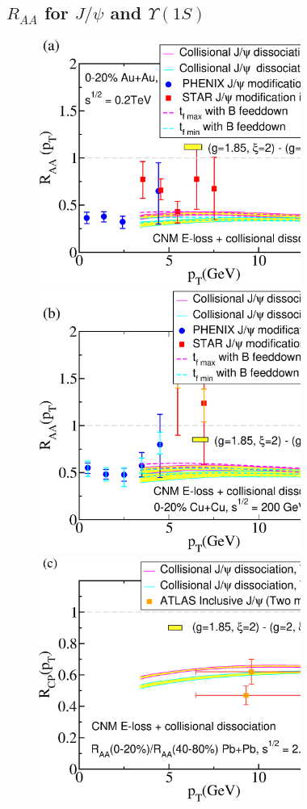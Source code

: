\documentclass[article,showpacs,preprintnumbers,amsmath,amssymb]{revtex4}
\begin{document}
\subsection{$R_{AA}$ for $J/\psi$ and $\Upsilon(1S)$~\label{section:NoCronin}}
\begin{figure}[!t]
\vspace*{.2in}
\includegraphics[width=3.38in,angle=0]{fig6_rhic0200auau.eps} 
\includegraphics[width=3.38in,angle=0]{fig7_rhic0200cucu.eps} 
\includegraphics[width=3.38in,angle=0]{fig8_lhc2760pbpbrcp.eps}

\end{figure}
\end{document}
